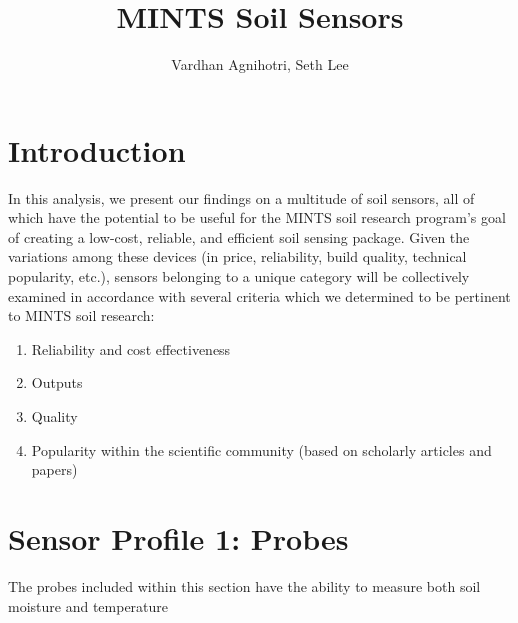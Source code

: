\documentclass{article}
\title{MINTS Soil Sensors}
\author{Vardhan Agnihotri, Seth Lee}
\begin{document}
\maketitle

\section{Introduction}
In this analysis, we present our findings on a multitude of soil sensors, all of which have the potential to be useful for the MINTS soil research program's goal of creating a low-cost, reliable, and efficient soil sensing package. Given the variations among these devices (in price, reliability, build quality, technical popularity, etc.), sensors belonging to a unique category will be collectively examined in accordance with several criteria which we determined to be pertinent to MINTS soil research:
\begin{enumerate}
    \item Reliability and cost effectiveness
    \item Outputs
    \item Quality %
    \item Popularity within the scientific community (based on scholarly articles and papers)
\end{enumerate}


\section{Sensor Profile 1: Probes}
The probes included within this section have the ability to measure both soil moisture and temperature
\end{document}
